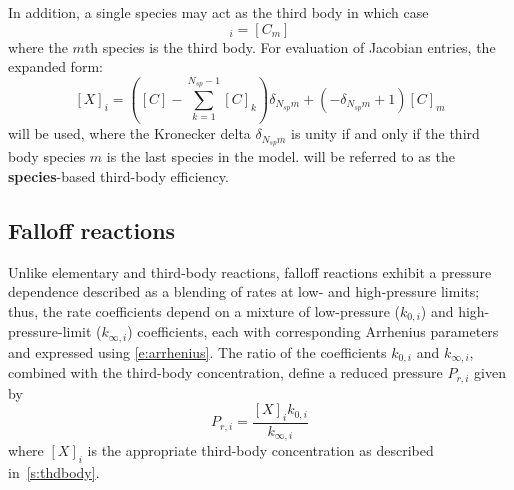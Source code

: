 \documentclass[12pt,number,sort&compress]{elsarticle}
\newcommand{\ns}{N_{sp}}
\begin{document}
In addition, a single species may act as the third body in which case
\begin{equation}
 [X]_{i} = [C_m]
\end{equation}
where the $m$th species is the third body.
For evaluation of Jacobian entries, the expanded form:
\begin{equation}
\label{e:thd_spec}
 [X]_{i}=\left([C] - \sum_{k=1}^{\ns  - 1} [C]_{k}\right) \delta_{\ns m} + \left(- \delta_{\ns m} + 1\right) [C]_{m}
\end{equation}
will be used, where the Kronecker delta $\delta_{\ns m}$ is unity if and only if the third body species $m$ is the last species in the model.
 will be referred to as the \textbf{species}-based third-body efficiency.


\subsection{Falloff reactions}
Unlike elementary and third-body reactions, falloff reactions exhibit a pressure dependence described as a blending of rates at low- and high-pressure limits; thus, the rate coefficients depend on a mixture of low-pressure ($k_{0, i}$) and high-pressure-limit ($k_{\infty,i}$) coefficients, each with corresponding Arrhenius parameters and expressed using \cref{e:arrhenius}.
The ratio of the coefficients $k_{0, i}$ and $k_{\infty, i}$, combined with the third-body concentration, define a reduced pressure $P_{r,i}$ given by
\begin{equation}
 \label{e:pr}
 P_{r, i}=\frac{[X]_{i} k_{0, i}}{k_{\infty, i}}
\end{equation}
where $[X]_{i}$ is the appropriate third-body concentration as described in~\cref{s:thdbody}.
\end{document}
